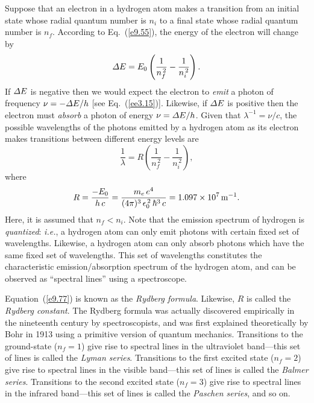 Suppose that an electron in a hydrogen atom
makes a transition from an initial state whose radial quantum
number is $n_i$ to a final state whose radial quantum number is $n_f$. 
According to Eq.~(\ref{e9.55}), the energy of the electron
will change by
\begin{equation}
{\mit\Delta} E = E_0\left(\frac{1}{n_f^{\,2}}-\frac{1}{n_i^{\,2}}\right).
\end{equation}
If ${\mit\Delta} E$ is negative then we would expect the electron
to {\em emit}\/ a photon of frequency $\nu=- {\mit\Delta}E/h$ [see Eq.~(\ref{ee3.15})]. Likewise, if ${\mit\Delta} E$ is positive then the electron
must {\em absorb}\/ a photon of energy $\nu={\mit\Delta}E/h$. 
Given that $\lambda^{-1}=\nu/c$, the possible wavelengths of 
 the photons emitted by a hydrogen atom as its electron makes
transitions between different energy levels are 
\begin{equation}\label{e9.77}
\frac{1}{\lambda} = R\left(\frac{1}{n_f^{\,2}}-\frac{1}{n_i^{\,2}}\right),
\end{equation}
where
\begin{equation}
R = \frac{-E_0}{h\,c} =\frac{m_e\,e^4}{(4\pi)^3\,\epsilon_0^{\,2}\,\hbar^3\,c} = 1.097\times 10^7\,{\rm m^{-1}}.
\end{equation}
Here, it is assumed that $n_f<n_i$. Note that the emission spectrum
of hydrogen is {\em quantized}: {\em i.e.}, a hydrogen atom
can only emit photons with certain fixed set of  wavelengths. Likewise, a hydrogen
atom can only absorb photons which have the same fixed set of wavelengths. 
This set of  wavelengths constitutes the characteristic emission/absorption
spectrum of the hydrogen atom, and can be observed as ``spectral lines'' using  a spectroscope.

Equation~(\ref{e9.77}) is known as the {\em Rydberg formula}. Likewise,
$R$ is called the {\em Rydberg constant}. The Rydberg formula
was actually discovered empirically in the nineteenth century by spectroscopists, and was first explained theoretically by Bohr in 1913 using a primitive version of quantum mechanics. Transitions to the ground-state ($n_f=1$) give rise to spectral lines in the ultraviolet band---this set of
lines is called the {\em Lyman series}. Transitions to the first excited
state ($n_f=2$) give rise to spectral lines in the visible band---this
set of lines is called the {\em Balmer series}. Transitions to the second excited
state ($n_f=3$) give rise to spectral lines in the infrared band---this
set of lines is called the {\em Paschen series}, and so on.

